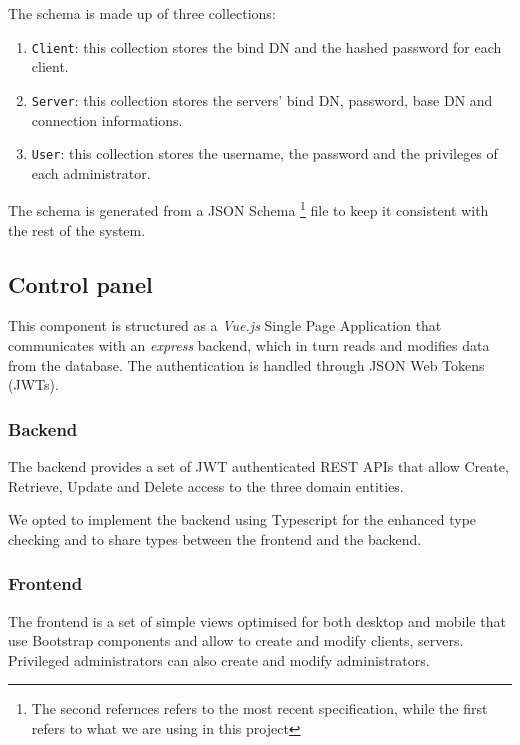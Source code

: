\documentclass{scrartcl}
\begin{document}
\par The schema is made up of three collections:
\begin{enumerate}
    \item \texttt{Client}: this collection stores the bind DN and the hashed password for each client.
    \item \texttt{Server}: this collection stores the servers' bind DN, password, base DN and connection informations.
    \item \texttt{User}: this collection stores the username, the password and the privileges of each administrator.
\end{enumerate}
\par The schema is generated from a JSON Schema \cite{handrews-json-schema-01}\cite{bhutton-json-schema-01}
\footnote{The second refernces refers to the most recent specification, while the first refers to what we are using in this project} file to keep it consistent with the rest of the system.

\subsection{Control panel}

\par This component is structured as a \textit{Vue.js} Single Page Application that communicates with an \textit{express} backend, which in turn reads and modifies data from the database. The authentication is handled through JSON Web Tokens (JWTs).
\subsubsection{Backend}
\par The backend provides a set of JWT authenticated REST APIs that allow Create, Retrieve, Update and Delete access to the three domain entities.
\par We opted to implement the backend using Typescript for the enhanced type checking and to share types between the frontend and the backend.
\subsubsection{Frontend}
\par The frontend is a set of simple views optimised for both desktop and mobile that use Bootstrap components and allow to create and modify clients, servers. Privileged administrators can also create and modify administrators.
\end{document}
